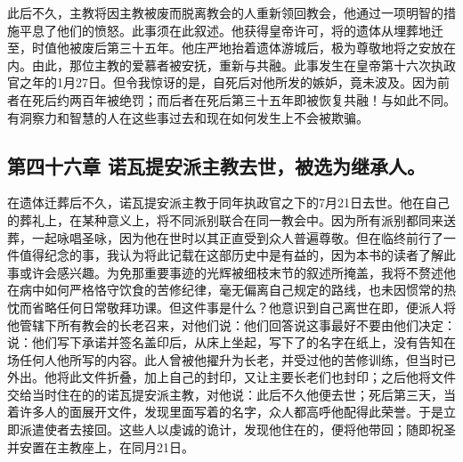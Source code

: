 此后不久，主教将因主教被废而脱离教会的人重新领回教会，他通过一项明智的措施平息了他们的愤怒。此事须在此叙述。他获得皇帝许可，将的遗体从埋葬地迁至，时值他被废后第三十五年。他庄严地抬着遗体游城后，极为尊敬地将之安放在内。由此，那位主教的爱慕者被安抚，重新与共融。此事发生在皇帝第十六次执政官之年的1月27日。但令我惊讶的是，自死后对他所发的嫉妒，竟未波及。因为前者在死后约两百年被绝罚；而后者在死后第三十五年即被恢复共融！与如此不同。有洞察力和智慧的人在这些事过去和现在如何发生上不会被欺骗。\par


\subsection{第四十六章 诺瓦提安派主教去世，被选为继承人。}

在遗体迁葬后不久，诺瓦提安派主教于同年执政官之下的7月21日去世。他在自己的葬礼上，在某种意义上，将不同派别联合在同一教会中。因为所有派别都同来送葬，一起咏唱圣咏，因为他在世时以其正直受到众人普遍尊敬。但在临终前行了一件值得纪念的事，我认为将此记载在这部历史中是有益的，因为本书的读者了解此事或许会感兴趣。为免那重要事迹的光辉被细枝末节的叙述所掩盖，我将不赘述他在病中如何严格恪守饮食的苦修纪律，毫无偏离自己规定的路线，也未因惯常的热忱而省略任何日常敬拜功课。但这件事是什么？他意识到自己离世在即，便派人将他管辖下所有教会的长老召来，对他们说：他们回答说这事最好不要由他们决定：说：他们写下承诺并签名盖印后，从床上坐起，写下了的名字在纸上，没有告知在场任何人他所写的内容。此人曾被他擢升为长老，并受过他的苦修训练，但当时已外出。他将此文件折叠，加上自己的封印，又让主要长老们也封印；之后他将文件交给当时住在的的诺瓦提安派主教，对他说：此后不久他便去世；死后第三天，当着许多人的面展开文件，发现里面写着的名字，众人都高呼他配得此荣誉。于是立即派遣使者去接回。这些人以虔诚的诡计，发现他住在的，便将他带回；随即祝圣并安置在主教座上，在同月21日。\par

